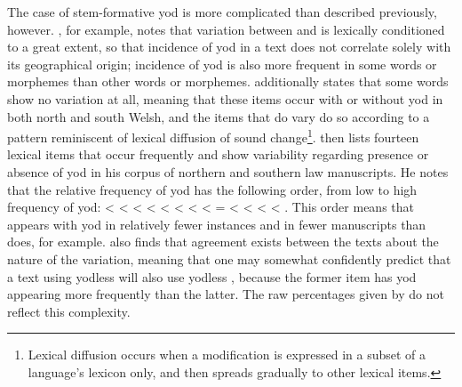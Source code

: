 The case of stem-formative yod is more complicated than described previously, however. \Textcite{Rus_Celtic90}, for example, notes that variation between  and  is  lexically conditioned to a great extent, so that incidence of yod in a text does not correlate solely with its geographical origin; incidence of yod is also more frequent in some words or morphemes than other words or morphemes. \Textcite[106]{Wil_Lexical05}  additionally states  that some words show no variation at all, meaning that these items occur with or without yod in both north and south Welsh, and the items that do vary do so according to a pattern reminiscent of lexical diffusion of sound change\footnote{Lexical diffusion occurs when a modification is expressed in a subset of a language's lexicon only, and then spreads gradually to other lexical items.}. \Textcite[116]{Wil_Lexical05} then lists fourteen lexical items that occur frequently and show variability regarding presence or absence of yod in his corpus of northern and southern law manuscripts. He notes that the relative frequency of yod has the following order, from low  to high frequency of yod:  <  <  <  <  <  <  <  <  =  <  <  <  < . This order means  that  appears with yod in relatively fewer instances and in fewer manuscripts than  does, for example. \Textcite[117]{Wil_Lexical05} also finds that agreement exists between the texts about the nature of the variation, meaning that one may somewhat confidently predict that a text using yodless  will also use yodless , because the former item has yod appearing more frequently than the latter. The raw percentages given by \textcite{Tho_Middle93} do not reflect this complexity.

